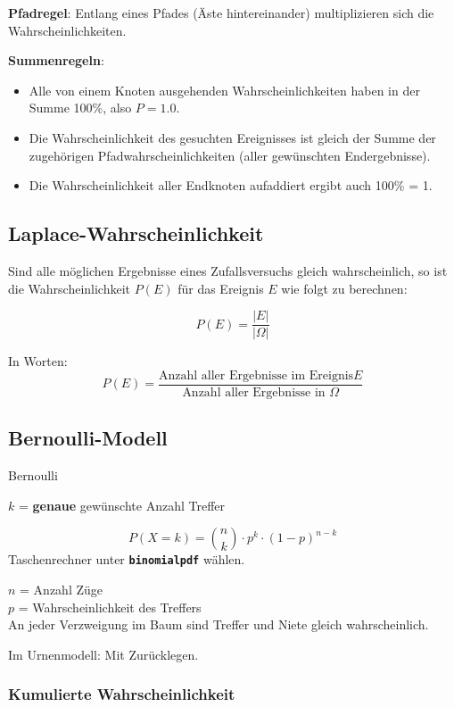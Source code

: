 \begin{multicols}{2}
\textbf{Pfadregel}:
Entlang eines Pfades (Äste hintereinander) multiplizieren sich die
Wahrscheinlichkeiten.

\textbf{Summenregeln}:
\begin{itemize}
\item Alle von einem Knoten ausgehenden Wahrscheinlichkeiten haben in
der Summe 100\%, also $P=1.0$.
\item Die Wahrscheinlichkeit des gesuchten Ereignisses ist gleich der
Summe der zugehörigen Pfadwahrscheinlichkeiten (aller gewünschten
Endergebnisse).
\item Die Wahrscheinlichkeit aller Endknoten aufaddiert ergibt auch
100\% = 1.
\end{itemize}




\subsection*{Laplace-Wahrscheinlichkeit}
Sind alle möglichen Ergebnisse eines Zufallsversuchs gleich
wahrscheinlich, so ist die Wahrscheinlichkeit $P(E)$ für das Ereignis
$E$ wie folgt zu berechnen:

\begin{gesetz*}{}{}
$$P(E) = \frac{|E|}{|\Omega|}$$
\end{gesetz*}

In Worten:
$$P(E) = \frac{\textrm{Anzahl aller Ergebnisse
im Ereignis
}E}{\textrm{Anzahl aller Ergebnisse in }\Omega}$$


\subsection*{Bernoulli-Modell}
\begin{gesetz*}{Bernoulli}{}

$k$ = \textbf{genaue} gewünschte Anzahl Treffer

$$P(X=k) = {n \choose k}\cdot{}p^k\cdot{}(1-p)^{n-k}$$
Taschenrechner
unter  \textbf{\texttt{binomialpdf}} wählen.

$n$ = Anzahl Züge\\
$p$ = Wahrscheinlichkeit des Treffers\\

An jeder Verzweigung im Baum sind Treffer und Niete gleich
wahrscheinlich.

Im Urnenmodell: Mit Zurücklegen.
\end{gesetz*}

\subsubsection*{Kumulierte Wahrscheinlichkeit}


\end{multicols}
